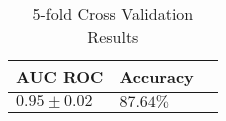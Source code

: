 \begin{table}
	\centering
	\begin{tabularx}{\textwidth}{XXX}
		\toprule
		AUC ROC         & Accuracy  \\
		\midrule
		$0.95 \pm 0.02$ & $87.64\%$ \\
		\bottomrule
	\end{tabularx}
	\caption*{5-fold Cross Validation Results}\label{tab:cv}
\end{table}
